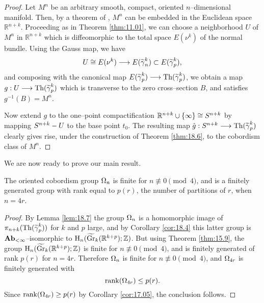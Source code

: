 \documentclass[../main]{subfiles}
\begin{document}
\begin{proof}
Let $M^n$ be an arbitrary smooth, compact, oriented $n$--dimensional manifold. Then, by a theorem of \cite{whitney1944}, $M^n$ can be embedded in the Euclidean space ${\mathbb R}^{n + k}$. Proceeding as in Theorem \ref{thm:11.01}, we can choose a neighborhood $U$ of $M^n$ in ${\mathbb R}^{n + k}$ which is diffeomorphic to the total space $E(\nu^k)$ of the normal bundle. Using the Gauss map, we have \[U \cong E(\nu^k) \longrightarrow E({\xtilde\tautological}_n^k) \subset E({\xtilde\tautological}_p^k),\] and composing with the canonical map $E({\xtilde\tautological}_p^k) \longrightarrow \thom({\xtilde\tautological}_p^k)$, we obtain a map $g : U \longrightarrow \thom({\xtilde\tautological}_p^k)$ which is transverse to the zero cross--section $B$, and satisfies $g^{-1}(B) = M^n$.

Now extend $g$ to the one--point compactification ${\mathbb R}^{n + k} \cup \{\infty\} \cong S^{n + k}$ by mapping $S^{n + k} - U$ to the base point $t_0$. The resulting map $\hat g : \sphere^{n + k} \longrightarrow \thom({\xtilde\tautological}_p^k)$ clearly gives rise, under the construction of Theorem \ref{thm:18.6}, to the cobordism class of $M^n$. 
\end{proof}

We are now ready to prove our main result.

\begin{theorem}[Thom]\label{thm:18.8}
The oriented cobordism group $\Omega_n$ is finite for $n \not \equiv 0 \pmod 4$, and is a finitely generated group with rank equal to $p(r)$, the number of partitions of $r$, when $n = 4r$. 
\end{theorem}

\begin{proof}
By Lemma \ref{lem:18.7} the group $\Omega_n$ is a homomorphic image of $\pi_{n + k}(\thom({\xtilde\tautological}_p^k))$ for $k$ and $p$ large, and by Corollary \ref{cor:18.4} this latter group is $\mathbf{Ab}_{<\infty}$--isomorphic to $\homology_n({\xtilde\grassmannian}_k({\mathbb R}^{k + p}); \mathbb Z)$. But using Theorem \ref{thm:15.9}, the group $\homology_n({\xtilde\grassmannian}_k({\mathbb R}^{k + p}); \mathbb Z)$ is finite for $n \not \equiv 0 \pmod 4$, and is finitely generated of rank $p(r)$ for $n = 4r$. Therefore $\Omega_n$ is finite for $n \not \equiv 0 \pmod 4$, and $\Omega_{4r}$ is finitely generated with \[\operatorname{rank}(\Omega_{4r}) \le p(r).\] Since $\operatorname{rank}(\Omega_{4r}) \ge p(r)$ by Corollary \ref{cor:17.05}, the conclusion follows. 
\end{proof}
\end{document}
